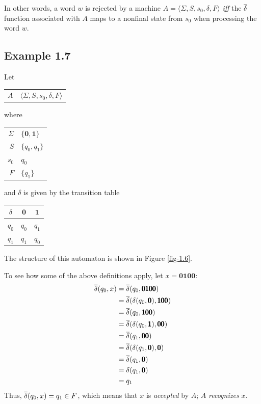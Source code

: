 In other words, a word $w$ is rejected by a machine
$A = \langle\Sigma,S,s_0,\delta,F\rangle$ \emph{iff} the $\overline{\delta}$ function associated
with $A$ maps to a nonfinal state from $s_0$ when processing the word $w$.

\subsection*{Example 1.7}

Let
\begin{center}\begin{tabular}{r@{ $=$ }l}
$A$ & $\langle\Sigma,S,s_0,\delta,F\rangle$
\end{tabular}\end{center}
where
\begin{center}\begin{tabular}{r@{ $=$ }l}
$\Sigma$ & $\{\pmb{0},\pmb{1}\}$ \\
$S$ & $\{q_0,q_1\}$ \\
$s_0$ & $q_0$ \\
$F$ & $\{q_1\}$
\end{tabular}\end{center}
and $\delta$ is given by the transition table
\begin{center}\begin{tabular}{c|cc}
$\delta$ & $\pmb{0}$ & $\pmb{1}$ \\
\hline
$q_0$ & $q_0$ & $q_1$ \\
$q_1$ & $q_1$ & $q_0$
\end{tabular}\end{center}
The structure of this automaton is shown in Figure \ref{fig-1.6}.

To see how some of the above definitions apply, let $x = \pmb{0100}$:
\begin{align*}
\overline{\delta}(q_0,x) &= \overline{\delta}(q_0, \pmb{0100}) \\
&= \overline{\delta}(\delta(q_0,\pmb{0}), \pmb{100}) \\
&= \overline{\delta}(q_0, \pmb{100}) \\
&= \overline{\delta}(\delta(q_0, \pmb{1}),\pmb{00}) \\
&= \overline{\delta}(q_1, \pmb{00}) \\
&= \overline{\delta}(\delta(q_1, \pmb{0}), \pmb{0}) \\
&= \overline{\delta}(q_1, \pmb{0}) \\
&= \delta(q_1, \pmb{0}) \\
&= q_1
\end{align*}
Thus, $\overline{\delta}(q_0,x) = q_1 \in F$, which means that $x$ is 
\emph{accepted} by $A$; $A$ \emph{recognizes} $x$.

